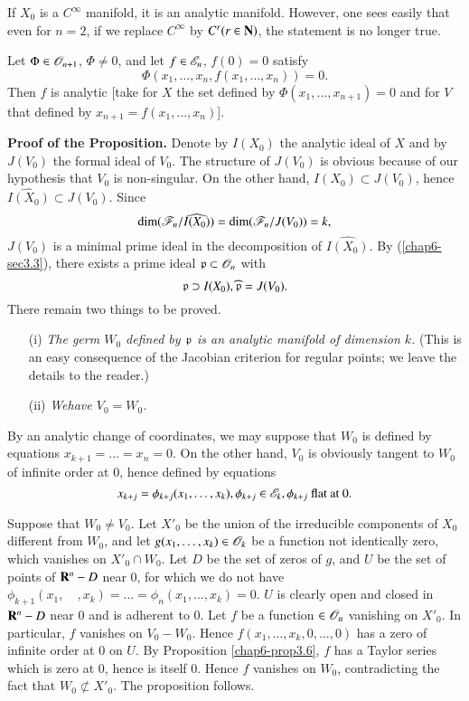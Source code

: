 \setcounter{subsection}{11}
\begin{subexample}\label{chap6-exam3.11.1}
If $X_{0}$ is a $C^{\infty}$ manifold, it is an analytic manifold. However, one sees easily that even for $n=2$, if we replace $C^{\infty}$ by $C^{r}(r\in \mathbf{N})$, the statement is no longer true.
\end{subexample}

\begin{subexample}\label{chap6-exam3.11.2}
Let $\Phi\in \mathscr{O}_{n+1}$, $\Phi\neq 0$, and let $f\in \mathscr{E}_{n}$, $f(0)=0$ satisfy
$$
\Phi(x_{1},\ldots,x_{n},f(x_{1},\ldots,x_{n}))=0.
$$
Then $f$ is analytic [take for $X$ the set defined by $\Phi(x_{1},\ldots,x_{n+1})=0$ and for $V$ that defined by $x_{n+1}=f(x_{1},\ldots,x_{n})$].
\end{subexample}

\noindent
{\bf Proof of the Proposition.} Denote by $I(X_{0})$ the analytic ideal of $X$ and by $J(V_{0})$ the formal ideal of $V_{0}$. The structure of $J(V_{0})$ is obvious because of our hypothesis that $V_{0}$ is non-singular. On the other hand, $I(X_{0})\subset J(V_{0})$, hence $\widehat{I(X_{0})}\subset J(V_{0})$. Since
$$
\dim (\mathscr{F}_{n}/\widehat{I(X_{0})})=\dim (\mathscr{F}_{n}/J(V_{0}))=k,
$$
$J(V_{0})$ is a minimal prime ideal in the decomposition of $\widehat{I(X_{0})}$. By (\ref{chap6-sec3.3}), there exists a prime ideal $\mathfrak{p}\subset \mathscr{O}_{n}$ with
$$
\mathfrak{p}\supset I(X_{0}), \widehat{\mathfrak{p}}=J(V_{0}).
$$
There remain two things to be proved.
\begin{itemize}
\item[(i)] {\em The germ $W_{0}$ defined by $\mathfrak{p}$ is an analytic manifold of dimension $k$.} (This is an easy consequence of the Jacobian criterion for regular points; we leave the details to the reader.)

\item[(ii)] {\em We\pageoriginale have $V_{0}=W_{0}$.}
\end{itemize}

By an analytic change of coordinates, we may suppose that $W_{0}$ is defined by equations $x_{k+1}=\ldots=x_{n}=0$. On the other hand, $V_{0}$ is obviously tangent to $W_{0}$ of infinite order at $0$, hence defined by equations
$$
x_{k+j}=\phi_{k+j}(x_{1},\ldots,x_{k}),\phi_{k+j}\in \mathscr{E}_{k}, \phi_{k+j}\text{ flat at $0$.}
$$

Suppose that $W_{0}\neq V_{0}$. Let $X'_{0}$ be the union of the irreducible components of $X_{0}$ different from $W_{0}$, and let $g(x_{1},\ldots,x_{k})\in \mathscr{O}_{k}$ be a function not identically zero, which vanishes on $X'_{0}\cap W_{0}$. Let $D$ be the set of zeros of $g$, and $U$ be the set of points of $\mathbf{R}^{n}-D$ near $0$, for which we do not have $\phi_{k+1}(x_{1},\quad,x_{k})=\ldots=\phi_{n}(x_{1},\ldots,x_{k})=0$. $U$ is clearly open and closed in $\mathbf{R}^{n}-D$ near $0$ and is adherent to $0$. Let $f$ be a function $\in \mathscr{O}_{n}$ vanishing on $X'_{0}$. In particular, $f$ vanishes on $V_{0}-W_{0}$. Hence $f(x_{1},\ldots,x_{k},0,\ldots,0)$ has a zero of infinite order at $0$ on $U$. By Proposition \ref{chap6-prop3.6}, $f$ has a Taylor series which is zero at $0$, hence is itself $0$. Hence $f$ vanishes on $W_{0}$, contradicting the fact that $W_{0}\nsubset X'_{0}$. The proposition follows.
